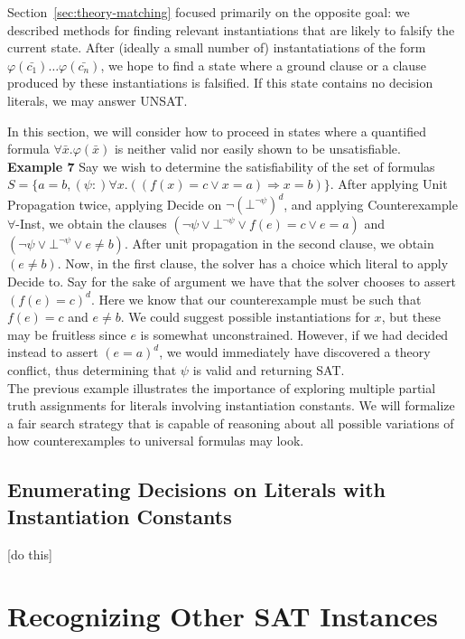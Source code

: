 \documentclass{llncs}
\begin{document}
Section~\ref{sec:theory-matching} focused primarily on the opposite goal: we described methods for finding relevant instantiations that are likely to falsify the current state.
After (ideally a small number of) instantatiations of the form $\varphi( \bar{c_1} ) \ldots \varphi( \bar{c_n} )$, we hope to find a state where a ground clause or a clause produced by these instantiations is falsified.
If this state contains no decision literals, we may answer UNSAT.

In this section, we will consider how to proceed in states where a quantified formula $\forall \bar{x}. \varphi( \bar{x} )$ is neither valid nor easily shown to be unsatisfiable. \\

{\bf Example 7} 
Say we wish to determine the satisfiability of the set of formulas $S = \{ a = b, (\psi :) \forall x. ((f(x) = c \vee x = a) \Rightarrow x = b) \}$.
After applying Unit Propagation twice, applying Decide on $\neg (\bot^{ \neg \psi })^d$, and applying Counterexample $\forall$-Inst, we obtain the clauses $( \neg \psi \vee \bot^{ \neg \psi } \vee f(e) = c \vee e = a )$ and $( \neg \psi \vee \bot^{ \neg \psi } \vee e \neq b )$.
After unit propagation in the second clause, we obtain $( e \neq b )$.
Now, in the first clause, the solver has a choice which literal to apply Decide to.
Say for the sake of argument we have that the solver chooses to assert $( f(e) = c )^d$.
Here we know that our counterexample must be such that $f( e ) = c$ and $e \neq b$.
We could suggest possible instantiations for $x$, but these may be fruitless since $e$ is somewhat unconstrained.
However, if we had decided instead to assert $( e = a )^d$, we would immediately have discovered a theory conflict, thus determining that $\psi$ is valid and returning SAT. \\

The previous example illustrates the importance of exploring multiple partial truth assignments for literals involving instantiation constants.
We will formalize a fair search strategy that is capable of reasoning about all possible variations of how counterexamples to universal formulas may look.

\subsection{Enumerating Decisions on Literals with Instantiation Constants}

[do this]

\section{Recognizing Other SAT Instances}
\end{document}
